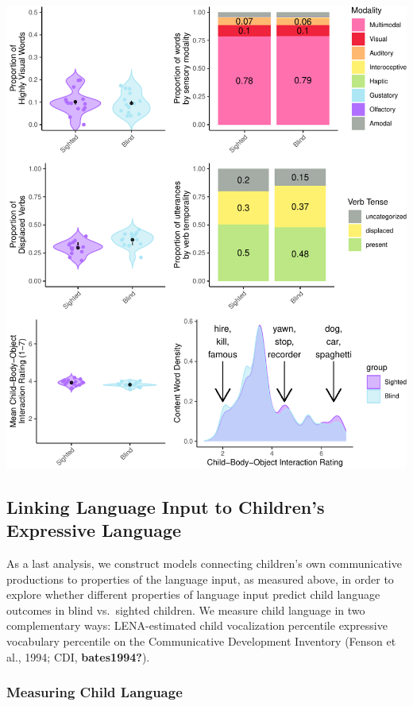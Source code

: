 \documentclass[
  man,floatsintext]{apa6}
\begin{document}
\includegraphics{input_quality_manuscript_files/figure-latex/conceptual-plots-1.pdf}

\hypertarget{linking-language-input-to-childrens-expressive-language}{%
\subsection{Linking Language Input to Children's Expressive Language}\label{linking-language-input-to-childrens-expressive-language}}

As a last analysis, we construct models connecting children's own communicative productions to properties of the language input, as measured above, in order to explore whether different properties of language input predict child language outcomes in blind vs.~sighted children. We measure child language in two complementary ways: LENA-estimated child vocalization percentile expressive vocabulary percentile on the Communicative Development Inventory (Fenson et al., 1994; CDI, \textbf{bates1994?}).

\hypertarget{measuring-child-language}{%
\subsubsection{Measuring Child Language}\label{measuring-child-language}}
\end{document}
